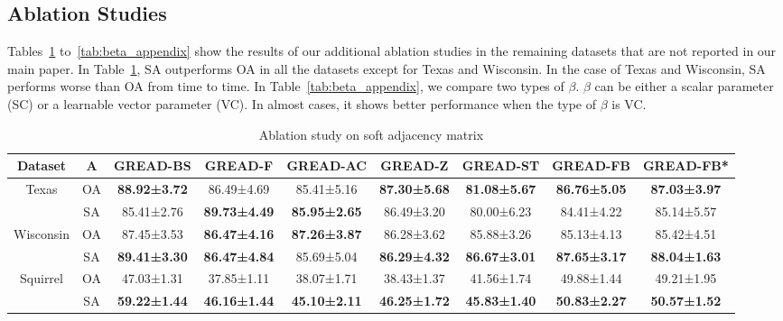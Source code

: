 \documentclass{article}
\theoremstyle{plain}
\theoremstyle{definition}
\theoremstyle{remark}
\newcommand{\std}{\scriptsize{}}
\begin{document}
\subsection{Ablation Studies}\label{a:ablation}
Tables~\ref{tab:soft_appendix} to~\ref{tab:beta_appendix} show the results of our additional ablation studies in the remaining datasets that are not reported in our main paper. In Table~\ref{tab:soft_appendix}, SA outperforms OA in all the datasets except for Texas and Wisconsin. In the case of Texas and Wisconsin, SA performs worse than OA from time to time. In Table~\ref{tab:beta_appendix}, we compare two types of $\beta$. $\beta$ can be either a scalar parameter (SC) or a learnable vector parameter (VC). In almost cases, it shows better performance when the type of $\beta$ is VC.

 \begin{table}[ht!]
     \small
     \centering
\caption{Ablation study on soft adjacency matrix}
     \label{tab:soft_appendix}
     \begin{tabular}{cc cccc ccc}\toprule
        Dataset & $\mathbf{A}$ &  GREAD-BS & GREAD-F & GREAD-AC & GREAD-Z & GREAD-ST & GREAD-FB & GREAD-FB*\\ 
        \midrule \multirow{2}{*}{Texas}
        & OA   &  \textbf{88.92\std{±3.72}} & 86.49\std{±4.69} & 85.41\std{±5.16} & \textbf{87.30\std{±5.68}} & \textbf{81.08\std{±5.67}} & \textbf{86.76\std{±5.05}} & \textbf{87.03\std{±3.97}}\\
        & SA   &  85.41\std{±2.76} & \textbf{89.73\std{±4.49}} & \textbf{85.95\std{±2.65}} & 86.49\std{±3.20} & 80.00\std{±6.23} & 84.41\std{±4.22} & 85.14\std{±5.57}\\
        \midrule \multirow{2}{*}{Wisconsin}
        & OA   &  87.45\std{±3.53} & \textbf{86.47\std{±4.16}} & \textbf{87.26\std{±3.87}} & 86.28\std{±3.62} & 85.88\std{±3.26} & 85.13\std{±4.13} & 85.42\std{±4.51}\\
        & SA   &  \textbf{89.41\std{±3.30}} & \textbf{86.47\std{±4.84}} & 85.69\std{±5.04} & \textbf{86.29\std{±4.32}} & \textbf{86.67\std{±3.01}} & \textbf{87.65\std{±3.17}} & \textbf{88.04\std{±1.63}}\\
        \midrule \multirow{2}{*}{Squirrel}
        & OA   &  47.03\std{±1.31} & 37.85\std{±1.11} & 38.07\std{±1.71} & 38.43\std{±1.37} & 41.56\std{±1.74} & 49.88\std{±1.44} & 49.21\std{±1.95}\\
        & SA   &  \textbf{59.22\std{±1.44}} & \textbf{46.16\std{±1.44}} & \textbf{45.10\std{±2.11}} & \textbf{46.25\std{±1.72}} & \textbf{45.83\std{±1.40}} & \textbf{50.83\std{±2.27}} & \textbf{50.57\std{±1.52}}\\

\end{tabular}
\end{table}
\end{document}

